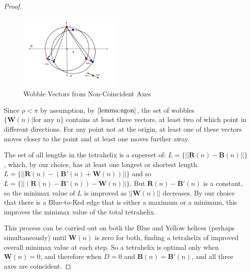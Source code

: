 \documentclass[twocolumn,10pt]{asme2ej}
\renewcommand{\vec}[1]{\mathbf{#1}}
\begin{document}
\begin{proof}
  \begin{figure}
     \centering
     \includegraphics[width=0.45\textwidth]{figures/WobbleDiagram.png}
     \caption{Wobble Vectors from Non-Coincident Axes}
  \label{fig:wobble}
\end{figure}

  Since $\rho < \pi$ by assumption, by $\cref{lemma:ngon}$,
  the set of wobbles $\{\vec{W}(n) | \text{for any n}\}$
  contains at least three vectors,
  at least two of which point in different directions.
  For any point not at the origin, at least one of these vectors moves closer to the
  point and at least one moves further away.

    The set of all lengths in the tetrahelix is a superset of:
    $L = \{|| \vec{R}(n) - \vec{B}(n)||\}$, which, by our choice,
    has at least one longest or shortest
    length.
    $L = \{|| \vec{R}(n) - (\vec{B'}(n) + \vec{W}(n))||\}$ and so
    $L = \{|| (\vec{R}(n) - \vec{B'}(n)) - \vec{W}(n)||\}$.
    But $\vec{R}(n) - \vec{B'}(n)$ is a constant, so the minimax value of $L$ is improved as $||\vec{W}(n)||$
    decreases.  
    By our choice that there is a Blue-to-Red edge that is either a maximum or a minimum,
    this improves the minimax value of the total tetrahelix.
    
    This process can be carried out on both the Blue and Yellow helices
    (perhaps simultaneously) until $\vec{W}(n)$ is
    zero for both, finding a tetrahelix of improved overall minimax value at each step.
    So a tetrahelix is optimal only when $\vec{W}(n) = 0$, and therefore when $D=0$ and
    $\vec{B}(n) = \vec{B'}(n)$, and all three axes are coincident.
\end{proof}
\end{document}
